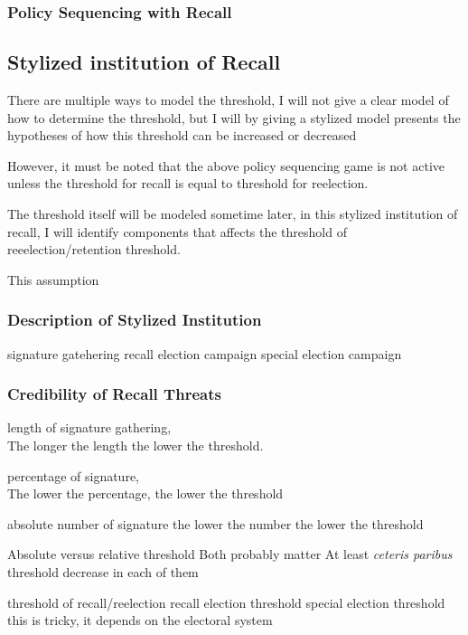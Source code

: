 \documentclass[hyphens, crop=false]{standalone}
\begin{document}
		\subsubsection*{Policy Sequencing with Recall}
		
		
	\subsection*{Stylized institution of Recall}
		There are multiple ways to model the threshold,
		I will not give a clear model of how to determine the threshold,
		but I will by giving a stylized model presents
		the hypotheses of how this threshold
		can be increased or decreased
	
	
		However, it must be noted that the above policy sequencing game is not active
		unless the threshold for recall is equal to threshold for reelection.
		
		The threshold itself will be modeled sometime later,
		in this stylized institution of recall,
		I will identify components that
		affects the threshold of reeelection/retention threshold.
		
		
		This assumption 
		
		\subsubsection*{Description of Stylized Institution}
		signature gatehering
		recall election campaign
		special election campaign
		
		\subsubsection*{Credibility of Recall Threats}
		
		length of signature gathering,\\
		The longer the length the lower the threshold.
		
		percentage of signature,\\
		The lower the percentage,
		the lower the threshold
		
		absolute number of signature
		the lower the number
		the lower the threshold
		
		Absolute versus relative threshold
		Both probably matter
		At least
		\textit{ceteris paribus}
		threshold decrease in each of them
		
		
		threshold of recall/reelection
		recall election threshold
		special election threshold
		this is tricky, it depends on the electoral system
		
\end{document}

